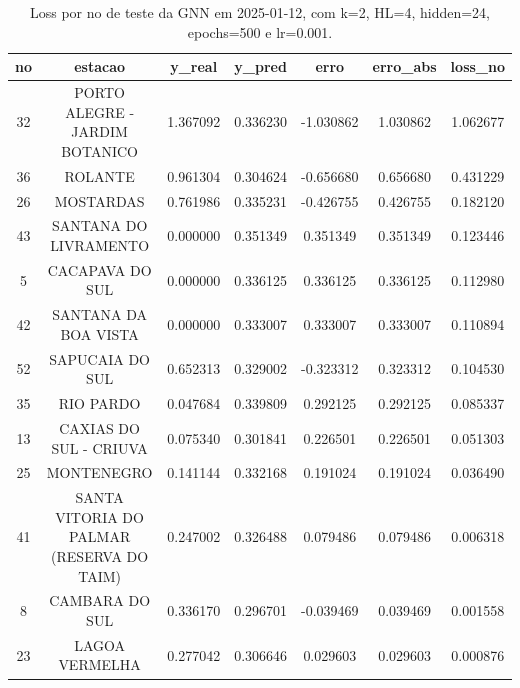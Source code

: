 \begin{table}[h]
\centering
\caption{Loss por no de teste da GNN em 2025-01-12, com k=2, HL=4, hidden=24, epochs=500 e lr=0.001.}
\label{tab:gnn_loss_k2_hl4_h24_e500_d20250112}
\begin{tabular}{ccccccc}
\toprule
no & estacao & y\_real & y\_pred & erro & erro\_abs & loss\_no \\
\midrule
32 & PORTO ALEGRE - JARDIM BOTANICO & 1.367092 & 0.336230 & -1.030862 & 1.030862 & 1.062677 \\
36 & ROLANTE & 0.961304 & 0.304624 & -0.656680 & 0.656680 & 0.431229 \\
26 & MOSTARDAS & 0.761986 & 0.335231 & -0.426755 & 0.426755 & 0.182120 \\
43 & SANTANA DO LIVRAMENTO & 0.000000 & 0.351349 & 0.351349 & 0.351349 & 0.123446 \\
5 & CACAPAVA DO SUL & 0.000000 & 0.336125 & 0.336125 & 0.336125 & 0.112980 \\
42 & SANTANA DA BOA VISTA & 0.000000 & 0.333007 & 0.333007 & 0.333007 & 0.110894 \\
52 & SAPUCAIA DO SUL & 0.652313 & 0.329002 & -0.323312 & 0.323312 & 0.104530 \\
35 & RIO PARDO & 0.047684 & 0.339809 & 0.292125 & 0.292125 & 0.085337 \\
13 & CAXIAS DO SUL - CRIUVA & 0.075340 & 0.301841 & 0.226501 & 0.226501 & 0.051303 \\
25 & MONTENEGRO & 0.141144 & 0.332168 & 0.191024 & 0.191024 & 0.036490 \\
41 & SANTA VITORIA DO PALMAR (RESERVA DO TAIM) & 0.247002 & 0.326488 & 0.079486 & 0.079486 & 0.006318 \\
8 & CAMBARA DO SUL & 0.336170 & 0.296701 & -0.039469 & 0.039469 & 0.001558 \\
23 & LAGOA VERMELHA & 0.277042 & 0.306646 & 0.029603 & 0.029603 & 0.000876 \\
\bottomrule
\end{tabular}
\end{table}

